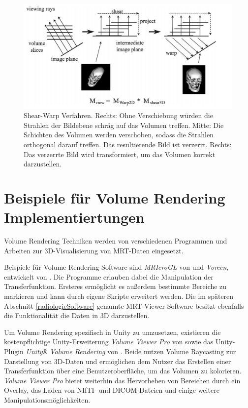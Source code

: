 \begin{figure}[!htb]
	\centering
	\includegraphics[width=0.7\linewidth]{images/shearwarp.png}
	\caption{Shear-Warp Verfahren. Rechts: Ohne Verschiebung würden die Strahlen der Bildebene schräg auf das Volumen treffen. Mitte: Die Schichten des Volumen werden verschoben, sodass die Strahlen orthogonal darauf treffen. Das resultierende Bild ist verzerrt. Rechts: Das verzerrte Bild wird transformiert, um das Volumen korrekt darzustellen.}
	\label{img:shearwarp}
\end{figure}
\FloatBarrier

\section{Beispiele für Volume Rendering Implementiertungen}
\label{volumeRenderingImplementierung}

Volume Rendering Techniken werden von verschiedenen Programmen und Arbeiten zur 3D-Visualisierung von MRT-Daten eingesetzt.

Beispiele für Volume Rendering Software sind \textit{MRIcroGL} von \cite{MRIcroGL} und \textit{Voreen}, entwickelt von \cite{voreen}. Die Programme erlauben dabei die Manipulation der Transferfunktion. Ersteres ermöglicht es außerdem bestimmte Bereiche zu markieren und kann durch eigene Skripte erweitert werden.
Die im späteren Abschnitt \ref{radiologieSoftware} genannte MRT-Viewer Software besitzt ebenfalls die Funktionalität die Daten in 3D darzustellen.

Um Volume Rendering spezifisch in Unity zu umzusetzen, existieren die kostenpflichtige Unity-Erweiterung \textit{Volume Viewer Pro} von \cite{volumeViewerPro} sowie das Unity-Plugin \textit{Unity® Volume Rendering} von \cite{volumeRenderingUnity}. Beide nutzen Volume Raycasting zur Darstellung von 3D-Daten und ermöglichen dem Nutzer das Erstellen einer Transferfunktion über eine Benutzeroberfläche, um das Volumen zu kolorieren. \textit{Volume Viewer Pro} bietet weiterhin das Hervorheben von Bereichen durch ein Overlay, das Laden von NIfTI- und DICOM-Dateien und einige weitere Manipulationsmöglichkeiten. 

